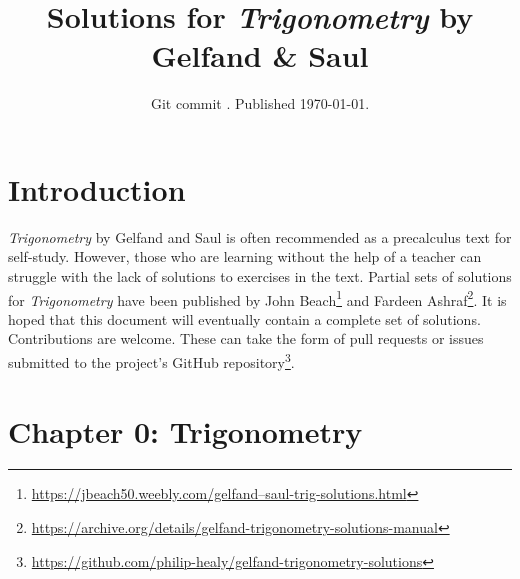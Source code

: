 \documentclass{article}
\title{Solutions for \textit{Trigonometry} by Gelfand \& Saul}
\author{}
\date{Git commit \texttt{\abbrevcommit}. Published \today.}
\newenvironment{solutions}[1]
{\subsection*{#1}
 \begin{enumerate}[leftmargin=1.5em]}
{\end{enumerate}}
\newcommand{\solution}{\item}
\begin{document}
\maketitle
\doclicenseThis

\section*{Introduction}
\textit{Trigonometry} by Gelfand and Saul is often recommended as a precalculus text for self-study.
However, those who are learning without the help of a teacher can struggle with the lack of solutions to exercises in the text.
Partial sets of solutions for \textit{Trigonometry} have been published by John Beach\footnote{\href{https://jbeach50.weebly.com/gelfand--saul-trig-solutions.html}{https://jbeach50.weebly.com/gelfand--saul-trig-solutions.html}} and Fardeen Ashraf\footnote{\href{https://archive.org/details/gelfand-trigonometry-solutions-manual}{https://archive.org/details/gelfand-trigonometry-solutions-manual}}.
It is hoped that this document will eventually contain a complete set of solutions.
Contributions are welcome. These can take the form of pull requests or issues submitted to the project's GitHub repository\footnote{\href{https://github.com/philip-healy/gelfand-trigonometry-solutions}{https://github.com/philip-healy/gelfand-trigonometry-solutions}}.

\section*{Chapter 0: Trigonometry}

\begin{comment}
\begin{solutions}{Page 3}
\solution
\solution
\solution
\end{solutions}

\begin{solutions}{Page 5}
\solution
\solution
\end{solutions}
\end{comment}
\end{document}
